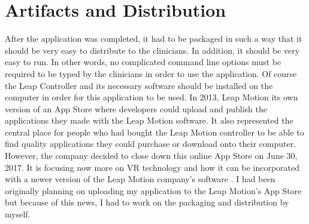 \section{Artifacts and Distribution}
After the application was completed, it had to be packaged in such a way that it should be very easy to distribute to the clinicians. In addition, it should be very easy to run. In other words, no complicated command line options must be required to be typed by the clinicians in order to use the application. Of course the Leap Controller and its necessary software should be installed on the computer in order for this application to be used. In 2013, Leap Motion its own version of an App Store where developers could upload and publish the applications they made with the Leap Motion software. It also represented the central place for people who had bought the Leap Motion controller to be able to find quality applications they could purchase or download onto their computer. However, the company decided to close down this online App Store on June 30, 2017. It is focusing now more on VR technology and how it can be incorporated with a newer version of the Leap Motion company's software \parencite{theKey}. I had been originally planning on uploading my application to the Leap Motion's App Store but because of this news, I had to work on the packaging and distribution by myself. 


